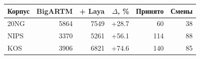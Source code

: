 \begin{tabular}{lrrrrr}\toprule
Корпус & BigARTM & + Laya & $\Delta$, \% & Принято & Смены\\\midrule
20NG & 5864 & 7549 & +28.7 & 60 & 38\\
NIPS & 3370 & 5261 & +56.1 & 114 & 88\\
KOS & 3906 & 6821 & +74.6 & 140 & 85\\
\bottomrule\end{tabular}
